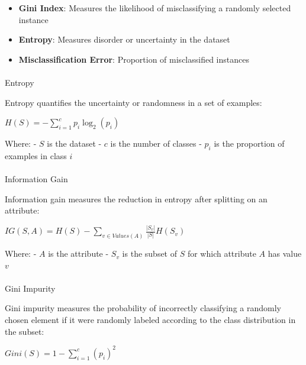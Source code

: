 \documentclass[
  letterpaper,
  DIV=11,
  numbers=noendperiod]{scrreprt}
\makeatletter
\let\oldparagraph\paragraph
\renewcommand{\paragraph}{
    \@ifstar
      \xxxParagraphStar
      \xxxParagraphNoStar
  }
\newcommand{\xxxParagraphStar}[1]{\oldparagraph*{#1}\mbox{}}
\newcommand{\xxxParagraphNoStar}[1]{\oldparagraph{#1}\mbox{}}
\providecommand{\tightlist}{%
  \setlength{\itemsep}{0pt}\setlength{\parskip}{0pt}}\usepackage{longtable,booktabs,array}
\makeatother
\begin{document}
\begin{itemize}
\tightlist
\item
  \textbf{Gini Index}: Measures the likelihood of misclassifying a
  randomly selected instance
\item
  \textbf{Entropy}: Measures disorder or uncertainty in the dataset
\item
  \textbf{Misclassification Error}: Proportion of misclassified
  instances
\end{itemize}

\paragraph{Entropy}\label{entropy}

Entropy quantifies the uncertainty or randomness in a set of examples:

\(H(S) = -\sum_{i=1}^{c} p_i \log_2(p_i)\)

Where: - \(S\) is the dataset - \(c\) is the number of classes - \(p_i\)
is the proportion of examples in class \(i\)

\paragraph{Information Gain}\label{information-gain}

Information gain measures the reduction in entropy after splitting on an
attribute:

\(IG(S, A) = H(S) - \sum_{v \in Values(A)} \frac{|S_v|}{|S|} H(S_v)\)

Where: - \(A\) is the attribute - \(S_v\) is the subset of \(S\) for
which attribute \(A\) has value \(v\)

\paragraph{Gini Impurity}\label{gini-impurity}

Gini impurity measures the probability of incorrectly classifying a
randomly chosen element if it were randomly labeled according to the
class distribution in the subset:

\(Gini(S) = 1 - \sum_{i=1}^{c} (p_i)^2\)
\end{document}
